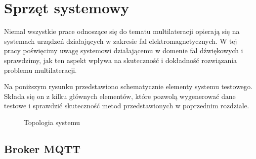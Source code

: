 \chapter{Sprzęt systemowy}\label{chap:hardware}

Niemal wszystkie prace odnoszące się do tematu multilateracji opierają się na systemach urządzeń działających w zakresie fal elektromagnetycznych. W tej pracy poświęcimy uwagę systemowi działającemu w domenie fal dźwiękowych i sprawdzimy, jak ten aspekt wpływa na skuteczność i dokładność rozwiązania problemu multilateracji.

Na poniższym rysunku przedstawiono schematycznie elementy systemu testowego. Składa się on z kilku głównych elementów, które pozwolą wygenerować dane testowe i sprawdzić skuteczność metod przedstawionych w poprzednim rozdziale.

\begin{figure}[H]
\centering
{}
\caption{Topologia systemu}
\label{pic:sys_topology}
\end{figure}

\section{Broker MQTT}

